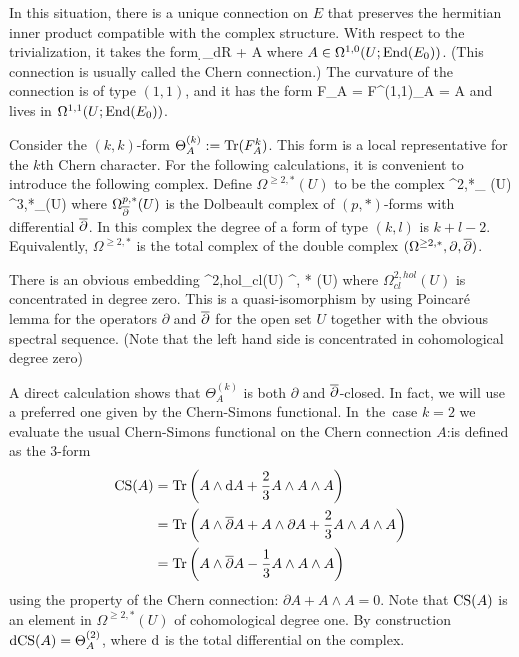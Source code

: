 
In this situation, there is a unique connection on $E$ 
that preserves the hermitian inner product compatible with the complex structure. 
With respect to the trivialization, it takes the form
\ben
\d_{dR} + A 
\een
where $A \in \Omega^{1,0}(U ; {\rm End}(E_0))$. 
(This connection is usually called the Chern connection.)  
The curvature of the connection is of type $(1,1)$, and it has the form
\ben
F_A = F^{(1,1)}_A = \dbar A 
\een
and lives in $\Omega^{1,1}(U ; {\rm End}(E_0))$.

Consider the $(k,k)$-form $\Theta^{(k)}_A := {\rm Tr} (F_A^k)$. 
This form is a local representative for the $k$th Chern character. 
For the following calculations, it is convenient to introduce the following complex. 
Define $\Omega^{\geq 2, *} (U)$ to be the complex
\ben
\Omega^{2,*}_{\dbar} (U) \xto{\partial} \Omega^{3,*}_{\dbar}(U) \xto{\partial} \cdots
\een
where $\Omega^{p,*}_{\overline{\partial}} (U)$ is the Dolbeault complex of
$(p,*)$-forms with differential $\overline{\partial}$. In this complex the degree of a form of type
$(k,l)$ is $k+l - 2$. Equivalently, $\Omega^{\geq 2, *}$ is the total complex of the
double complex $(\Omega^{\geq 2, *}, \partial, \overline{\partial})$. 

There is an obvious embedding
\ben
\Omega^{2,hol}_{cl}(U) \hookrightarrow \Omega^{, *} (U)
\een 
where $\Omega^{2,hol}_{cl}(U)$ is concentrated in degree zero. This is a quasi-isomorphism by using Poincar\'e lemma for the operators
$\partial$ and $\overline{\partial}$ for the open set
$U$ together with the obvious spectral sequence. (Note that the left hand side is concentrated in cohomological
degree zero)

A direct calculation shows that $\Theta^{(k)}_A$ is both $\partial$ and
$\overline{\partial}$-closed. In fact, we will use a
preferred one given by the Chern-Simons functional. 
\si
In the case $k = 2$ we evaluate the usual Chern-Simons functional on the Chern connection $A$:is defined as the $3$-form
\begin{align*}
{\rm CS} (A) & = {\rm Tr}\left(A \wedge {\rm d} A + \frac{2}{3} A \wedge A \wedge A \right) \\ & = {\rm Tr}\left(A \wedge \overline{\partial} A + A \wedge \partial A + \frac{2}{3} A \wedge A \wedge A \right) \\
& = {\rm Tr}\left(A \wedge \overline{\partial} A - \frac{1}{3} A\wedge A \wedge A\right)
\end{align*}
using the property of the Chern connection: $\partial A + A \wedge A = 0$. 
Note that ${\rm CS} (A)$ is an element in $\Omega^{\geq 2, *} (U)$ of cohomological degree one. 
By construction ${\rm d}{\rm CS}(A) =\Theta^{(2)}_A$, 
where ${\rm d}$ is the total differential on the complex. 

